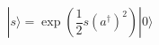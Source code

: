 \begin{equation}
| s \rangle =\exp\left(\frac{1}{2} s (a^{\dagger})^2 \right)
| 0 \rangle
\end{equation}

